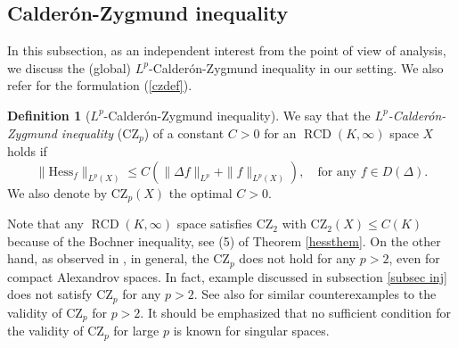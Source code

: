\documentclass[11pt,reqno]{amsart}
\theoremstyle{definition}
\newtheorem{definition}[theorem]{Definition}
\numberwithin{equation}{section}
\DeclareMathOperator{\RCD}{RCD}
\begin{document}
\subsection{Calder\'on-Zygmund inequality}\label{sublpcz}
In this subsection, as an independent interest from the point of view of analysis, we discuss the (global) $L^p$-Calder\'on-Zygmund inequality in our setting.
We also refer \cite{GPi, Pigola} for the formulation (\ref{czdef}). 
\begin{definition}[$L^p$-Calder\'on-Zygmund inequality]
We say that the \textit{$L^p$-Calder\'on-Zygmund inequality} ($\mathrm{CZ}_p$) of a constant $C>0$ for an $\RCD(K, \infty)$ space $X$ holds if 
\begin{equation}\label{czdef}
    \|\mathrm{Hess}_f\|_{L^p(X)} \le C \left(\|\Delta f\|_{L^p}+\|f\|_{L^p(X)}\right),\quad \text{for any $f \in D(\Delta)$.}
\end{equation}
We also denote by $\mathrm{CZ}_p(X)$ the optimal $C>0$.
\end{definition}
Note that any $\RCD(K, \infty)$ space satisfies $\mathrm{CZ}_2$ with $\mathrm{CZ}_2(X) \le C(K)$ because of the Bochner inequality, see (5) of Theorem \ref{hessthem}.
On the other hand, as observed in \cite{DZ}, in general, the $\mathrm{CZ}_p$ does not hold for any $p>2$, even for compact Alexandrov spaces. In fact, example discussed in subsection \ref{subsec inj} does not satisfy $\mathrm{CZ}_p$ for any $p>2$. See also \cite{HMRV} for similar counterexamples to the validity of $\mathrm{CZ}_p$ for $p>2$.
It should be emphasized that no sufficient condition for the validity of $\mathrm{CZ}_p$ for large $p$ is known for singular spaces.
\end{document}
